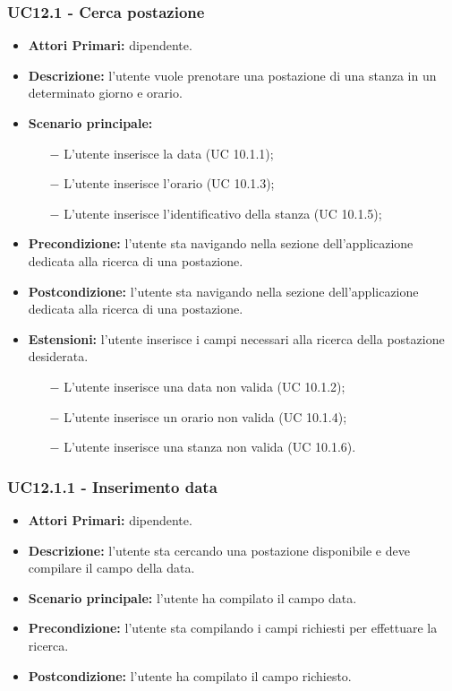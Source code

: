 \subsubsection{ UC12.1 - Cerca postazione}
\begin{itemize}
	\item\textbf{Attori Primari:} dipendente.
	\item\textbf{Descrizione:} l’utente vuole prenotare una postazione di una stanza in un determinato giorno e orario.
	\item\textbf{Scenario principale:} 
	\begin{itemize}
		\item[$-$] L’utente inserisce la data (UC 10.1.1);
		\item[$-$] L’utente inserisce l'orario (UC 10.1.3);
		\item[$-$] L’utente inserisce l'identificativo della stanza (UC 10.1.5);
	\end{itemize}
	\item\textbf{Precondizione:} l’utente sta navigando nella sezione dell'applicazione dedicata alla ricerca di una postazione.
	\item\textbf{Postcondizione:} l’utente sta navigando nella sezione dell'applicazione dedicata alla ricerca di una postazione.
	\item\textbf{Estensioni:} l’utente inserisce i campi necessari alla ricerca della postazione desiderata.
	\begin{itemize}
		\item[$-$] L’utente inserisce una data non valida (UC 10.1.2);
		\item[$-$] L’utente inserisce un orario non valida (UC 10.1.4);
		\item[$-$] L’utente inserisce una stanza non valida (UC 10.1.6).
	\end{itemize}
\end{itemize}
\subsubsection{ UC12.1.1 - Inserimento data }
\begin{itemize}
	\item\textbf{Attori Primari:} dipendente.
	\item\textbf{Descrizione:} l’utente sta cercando una postazione disponibile e deve compilare il campo della data.
	\item\textbf{Scenario principale:} l’utente ha compilato il campo data.
	\item\textbf{Precondizione:} l’utente sta compilando i campi richiesti per effettuare la ricerca.
	\item\textbf{Postcondizione:} l’utente ha compilato il campo richiesto.
\end{itemize}
